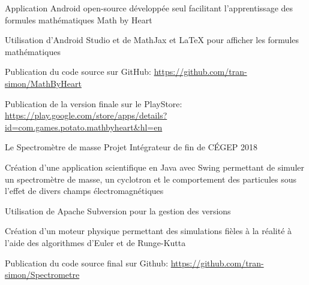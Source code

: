 \begin{cventries}
    \cventry
        {Application Android open-source développée seul facilitant l'apprentissage des formules mathématiques}
        {Math by Heart}
        {}
        {}
        {
       \begin{cvitems}
       \item{Utilisation d'Android Studio et de MathJax et LaTeX pour afficher les formules mathématiques}
       \item{Publication du code source sur GitHub: \url{https://github.com/tran-simon/MathByHeart}}
       \item{Publication de la version finale sur le PlayStore: \url{https://play.google.com/store/apps/details?id=com.games.potato.mathbyheart&hl=en}}
       \end{cvitems}
        }
    \cventry
        {Le Spectromètre de masse}
        {Projet Intégrateur de fin de CÉGEP}
        {2018}
        {}
        {
            \begin{cvitems}
            \item{Création d'une application scientifique en Java avec Swing permettant de simuler un spectromètre de masse, un cyclotron et le comportement des particules sous l'effet de divers champs électromagnétiques}
            \item{Utilisation de Apache Subversion pour la gestion des versions}
            \item{Création d'un moteur physique permettant des simulations fièles à la réalité à l'aide des algorithmes d'Euler et de Runge-Kutta}
            \item{Publication du code source final sur Github: \url{https://github.com/tran-simon/Spectrometre}}
            \end{cvitems}
        }
\end{cventries}
